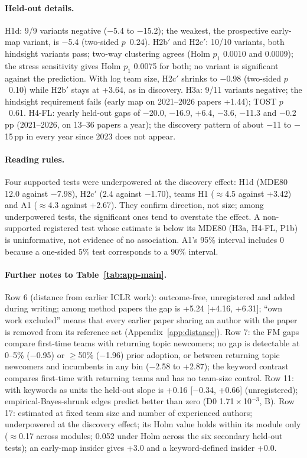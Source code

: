 \paragraph{Held-out details.} H1d: 9/9 variants negative ($-$5.4 to $-$15.2); the weakest, the prospective early-map
variant, is $-$5.4 (two-sided $p$~0.24). H2b$'$ and H2c$'$: 10/10 variants, both hindsight variants pass; two-way
clustering agrees (Holm $p_1$ 0.0010 and 0.0009); the stress sensitivity gives Holm $p_1$ 0.0075 for both; no variant
is significant against the prediction. With log team size, H2c$'$ shrinks to $-$0.98 (two-sided $p$~0.10) while
H2b$'$ stays at +3.64, as in discovery. H3a: 9/11 variants negative; the hindsight requirement fails (early map on
2021--2026 papers +1.44); TOST $p$~0.61. H4-FL: yearly held-out gaps of $-$20.0, $-$16.9, +6.4, $-$3.6, $-$11.3 and
$-$0.2\,pp (2021--2026, on 13--36 papers a year); the discovery pattern of about $-$11 to $-$15\,pp in every year since
2023 does not appear.

\paragraph{Reading rules.} Four supported tests were underpowered at the discovery effect: H1d (MDE80 12.0 against
$-$7.98), H2c$'$ (2.4 against $-$1.70), teams H1 ($\approx$4.5 against +3.42) and A1 ($\approx$4.3 against +2.67).
They confirm direction, not size; among underpowered tests, the significant ones tend to overstate the effect. A
non-supported registered test whose estimate is below its MDE80 (H3a, H4-FL, P1b) is uninformative, not evidence of no
association. A1's 95\% interval includes 0 because a one-sided 5\% test corresponds to a 90\% interval.

\paragraph{Further notes to Table~\ref{tab:app-main}.} Row 6 (distance from earlier ICLR work): outcome-free,
unregistered and added during writing; among method papers the gap is +5.24 [+4.16, +6.31]; ``own work excluded''
means that every earlier paper sharing an author with the paper is removed from its reference set
(Appendix~\ref{app:distance}). Row 7: the FM gaps compare first-time teams with returning topic newcomers; no gap is
detectable at 0--5\% ($-$0.95) or $\geq$50\% ($-$1.96) prior adoption, or between returning topic newcomers and
incumbents in any bin ($-$2.58 to +2.87); the keyword contrast compares first-time with returning teams and has no
team-size control. Row 11: with keywords as units the held-out slope is +0.16 [$-$0.34, +0.66] (unregistered);
empirical-Bayes-shrunk edges predict better than zero (D0 1.71\,$\times$\,10$^{-3}$, B). Row 17: estimated at fixed
team size and number of experienced authors; underpowered at the discovery effect; its Holm value holds within its
module only ($\approx$0.17 across modules; 0.052 under Holm across the six secondary held-out tests); an early-map
insider gives +3.0 and a keyword-defined insider +0.0.

